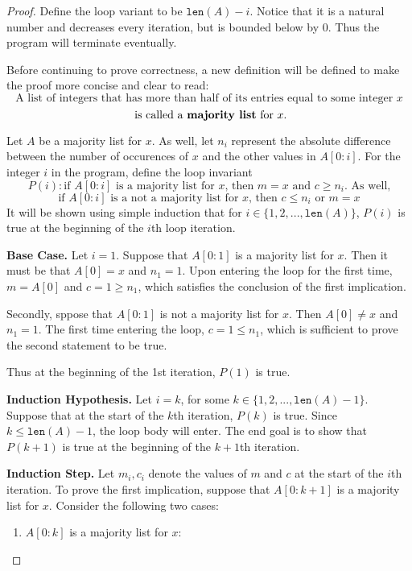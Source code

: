 \documentclass[11pt]{article}
\begin{document}
    \begin{proof}
        Define the loop variant to be \(\texttt{len}(A) - i\). Notice that it is a natural number and decreases every iteration, but is bounded below by 0. Thus the program will terminate eventually.

        Before continuing to prove correctness, a new definition will be defined to make the proof more concise and clear to read:
        \[
            \text{A list of integers that has more than half of its entries equal to some integer } x
        \]
        \[
            \text{ is called a \textbf{majority list} for } x \text{.}
        \]

        Let \(A\) be a majority list for \(x\). As well, let \(n_i\) represent the absolute difference between the number of occurences of \(x\) and the other values in \(A[0:i]\). For the integer \(i\) in the program, define the loop invariant
        \[
            P(i) : \text{if } A[0:i] \text{ is a majority list for } x \text{, then } m=x \text{ and } c \geq n_i \text{. As well,}
        \]
        \[
            \text{if } A[0:i] \text{ is a not a majority list for } x \text{, then } c\leq n_i \text{ or } m=x
        \]
        It will be shown using simple induction that for \(i \in \{1,2,...,\texttt{len}(A)\}\), \(P(i)\) is true at the beginning of the \(i\)th loop iteration.

        \textbf{Base Case.} Let \(i = 1\). Suppose that \(A[0:1]\) is a majority list for \(x\). Then it must be that \(A[0]=x\) and \(n_1=1\). Upon entering the loop for the first time, \(m=A[0]\) and \(c=1\geq n_1\), which satisfies the conclusion of the first implication.
        
        Secondly, sppose that \(A[0:1]\) is not a majority list for \(x\). Then \(A[0]\neq x\) and \(n_1=1\). The first time entering the loop, \(c=1\leq n_1\), which is sufficient to prove the second statement to be true.

        Thus at the beginning of the 1st iteration, \(P(1)\) is true.

        \textbf{Induction Hypothesis.} Let \(i=k\), for some \(k \in \{1,2,...,\texttt{len}(A) -1\}\). Suppose that at the start of the \(k\)th iteration, \(P(k)\) is true. Since \(k \leq \texttt{len}(A) -1\), the loop body will enter. The end goal is to show that \(P(k+1)\) is true at the beginning of the \(k+1\)th iteration.

        \textbf{Induction Step.} Let \(m_i, c_i\) denote the values of \(m\) and \(c\) at the start of the \(i\)th iteration. To prove the first implication, suppose that \(A[0:k+1]\) is a majority list for \(x\). Consider the following two cases:
        \begin{enumerate}
            \item \(A[0:k]\) is a majority list for \(x\):
            

\end{enumerate}
\end{proof}
\end{document}
